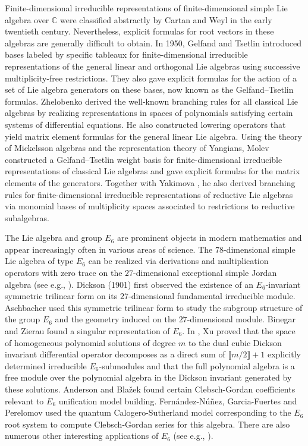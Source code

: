 \documentclass[12pt]{article}
\numberwithin{equation}{section}
\theoremstyle{definition}
\theoremstyle{remark}
\begin{document}
Finite-dimensional irreducible representations of finite-dimensional simple Lie algebra over $\mathbb{C}$ were classified abstractly by Cartan and Weyl in the early twentieth century.  Nevertheless, explicit formulas for root vectors in these algebras are generally difficult to obtain. In 1950, Gelfand and Tsetlin \cite{GT1, GT2} introduced bases labeled by specific tableaux for finite-dimensional irreducible representations of the general linear and orthogonal Lie algebras using successive multiplicity-free restrictions. They also gave explicit formulas for the action of a set of Lie algebra generators on these bases, now known as the Gelfand–Tsetlin formulas. Zhelobenko \cite{DPZ1,DPZ2} derived the well-known branching rules for all classical Lie algebras by realizing representations in spaces of polynomials satisfying certain systems of differential equations. He also constructed lowering operators that yield matrix element formulas for the general linear Lie algebra. Using the theory of Mickelsson algebras and the representation theory of Yangians, Molev \cite{M1,M2,M3,M4} constructed a Gelfand–Tsetlin weight basis for finite-dimensional irreducible representations of classical Lie algebras and gave explicit formulas for the matrix elements of the generators. Together with Yakimova \cite{MY}, he also derived branching rules for finite-dimensional irreducible representations of reductive Lie algebras via monomial bases of multiplicity spaces associated to restrictions to reductive subalgebras. 

The Lie algebra and group $E_6$ are prominent objects in modern mathematics and appear increasingly often in various areas of science. The $78$-dimensional simple Lie algebra of type $E_6$ can be realized via derivations and multiplication operators with zero trace on the $27$-dimensional exceptional simple Jordan algebra (see e.g., \cite{A,T}). Dickson \cite{D} (1901) first observed the existence of an $E_6$-invariant symmetric trilinear form on its $27$-dimensional fundamental irreducible module. Aschbacher \cite{As1,As2,As3,As4} used this symmetric trilinear form to study the subgroup structure of the group $E_6$ and the geometry induced on the $27$-dimensional module. Binegar and Zierau \cite{BZ} found a singular representation of $E_6$. In \cite{X1}, Xu proved that the space of homogeneous polynomial solutions of degree $m$ to the dual cubic Dickson invariant differential operator decomposes as a direct sum of $\llbracket m/2 \rrbracket+1$ explicitly determined irreducible $E_6$-submodules and that the full polynomial algebra is a free module over the polynomial algebra in the Dickson invariant generated by these solutions. Anderson and Blažek \cite{AB1,AB2,AB3} found certain Clebsch-Gordan coefficients relevant to $E_6$ unification model building.  Fernández-Núñez, Garcia-Fuertes and Perelomov \cite{FGP} used the quantum Calogero-Sutherland model corresponding to the $E_6$ root system to compute Clebsch-Gordan series for this algebra. There are also numerous other interesting applications of $E_6$ (see e.g., \cite{BK, GSA, G}).
\end{document}
